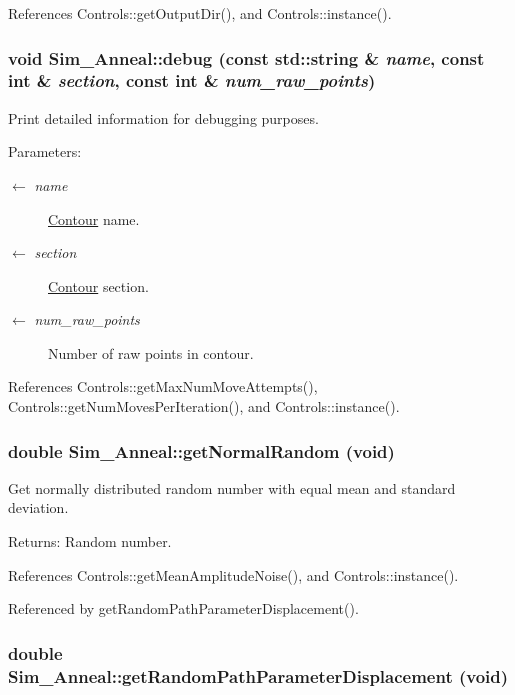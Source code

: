 References Controls::getOutputDir(), and Controls::instance().\hypertarget{classSim__Anneal_2141dd9baa6a1cba3d5d98f2a1d025b1}{
\subsubsection[debug]{\setlength{\rightskip}{0pt plus 5cm}void Sim\_\-Anneal::debug (const std::string \& {\em name}, \/  const int \& {\em section}, \/  const int \& {\em num\_\-raw\_\-points})}}
\label{classSim__Anneal_2141dd9baa6a1cba3d5d98f2a1d025b1}


Print detailed information for debugging purposes. \begin{Desc}
\item[Parameters:]
\begin{description}
\item[\mbox{$\leftarrow$} {\em name}]\hyperlink{classContour}{Contour} name. \item[\mbox{$\leftarrow$} {\em section}]\hyperlink{classContour}{Contour} section. \item[\mbox{$\leftarrow$} {\em num\_\-raw\_\-points}]Number of raw points in contour. \end{description}
\end{Desc}


References Controls::getMaxNumMoveAttempts(), Controls::getNumMovesPerIteration(), and Controls::instance().\hypertarget{classSim__Anneal_005408a3fedc95d5b8c5ba72d253998a}{
\subsubsection[getNormalRandom]{\setlength{\rightskip}{0pt plus 5cm}double Sim\_\-Anneal::getNormalRandom (void)}}
\label{classSim__Anneal_005408a3fedc95d5b8c5ba72d253998a}


Get normally distributed random number with equal mean and standard deviation. \begin{Desc}
\item[Returns:]Random number. \end{Desc}


References Controls::getMeanAmplitudeNoise(), and Controls::instance().

Referenced by getRandomPathParameterDisplacement().\hypertarget{classSim__Anneal_515e446dea914e0e8e3651738f88de36}{
\subsubsection[getRandomPathParameterDisplacement]{\setlength{\rightskip}{0pt plus 5cm}double Sim\_\-Anneal::getRandomPathParameterDisplacement (void)}}
\label{classSim__Anneal_515e446dea914e0e8e3651738f88de36}


